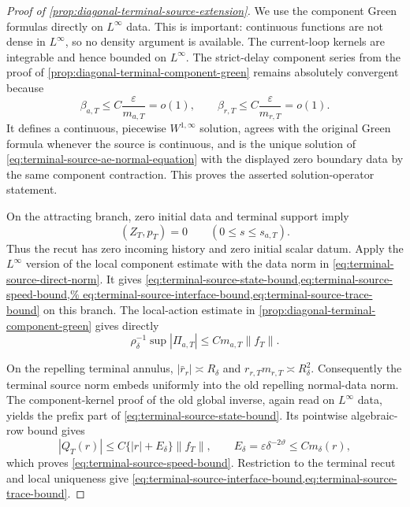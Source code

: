 \begin{proof}[Proof of
\cref{prop:diagonal-terminal-source-extension}]
We use the component Green formulas directly on \(L^\infty\) data.  This is
important: continuous functions are not dense in \(L^\infty\), so no
density argument is available.  The current-loop kernels are integrable
and hence bounded on \(L^\infty\).  The strict-delay component series from
the proof of \cref{prop:diagonal-terminal-component-green} remains
absolutely convergent because
\begin{equation}
 \beta_{a,T}\le C\frac{\varepsilon}{m_{a,T}}=o(1),
 \qquad
 \beta_{r,T}\le C\frac{\varepsilon}{m_{r,T}}=o(1).          \label{eq:proof-terminal-source-generation}
\end{equation}
It defines a continuous, piecewise \(W^{1,\infty}\) solution, agrees with
the original Green formula whenever the source is continuous, and is
the unique solution of
\cref{eq:terminal-source-ae-normal-equation} with the displayed zero
boundary data by the same component contraction.  This proves the asserted
solution-operator statement.

On the attracting branch, zero initial data and terminal support imply
\begin{equation*}
 (Z_T,p_T)=0\qquad(0\le s\le s_{a,T}).
\end{equation*}
Thus the recut has zero incoming history and zero initial scalar datum.
Apply the \(L^\infty\) version of the local component estimate with the
data norm in \cref{eq:terminal-source-direct-norm}.  It gives
\cref{eq:terminal-source-state-bound,eq:terminal-source-speed-bound,%
eq:terminal-source-interface-bound,eq:terminal-source-trace-bound} on this
branch.  The local-action estimate in
\cref{prop:diagonal-terminal-component-green} gives directly
\begin{equation*}
 \rho_\delta^{-1}\sup|\Pi_{a,T}|
 \le Cm_{a,T}\|f_T\|.
\end{equation*}

On the repelling terminal annulus,
\(
|\bar r_r|\asymp R_\delta
\)
and
\(
r_{r,T}m_{r,T}\asymp R_\delta^2
\).
Consequently the terminal source norm embeds uniformly into the old
repelling normal-data norm.  The component-kernel proof of the old global
inverse, again read on \(L^\infty\) data, yields the prefix part of
\cref{eq:terminal-source-state-bound}.  Its pointwise algebraic-row bound
gives
\begin{equation}
 |Q_T(r)|\le C\{|r|+E_\delta\}\|f_T\|,
 \qquad E_\delta=\varepsilon\delta^{-2\vartheta}
       \le Cm_\delta(r),                                  \label{eq:proof-terminal-source-Q}
\end{equation}
which proves \cref{eq:terminal-source-speed-bound}.  Restriction to the
terminal recut and local uniqueness give
\cref{eq:terminal-source-interface-bound,eq:terminal-source-trace-bound}.


\end{proof}

